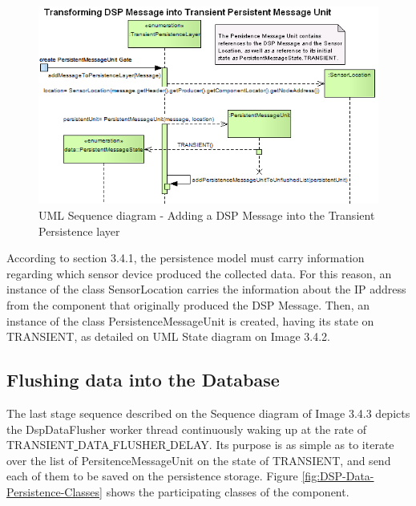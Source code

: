 \begin{figure}[!b]
  \centering
  \includegraphics[scale=0.5]{../diagrams/From-Create-PersistentMessageUnit-to-TransientPersistence-Layer-Sequence}
  \caption{UML Sequence diagram - Adding a DSP Message into the Transient Persistence layer}
  \label{fig:From-Create-PersistentMessageUnit-to-TransientPersistence-Layer-Sequence}
\end{figure}

According to section 3.4.1, the persistence model must carry information
regarding which sensor device produced the collected data. For this reason, an
instance of the class SensorLocation carries the information about the IP
address from the component that originally produced the DSP Message. Then, an
instance of the class PersistenceMessageUnit is created, having its state on
TRANSIENT, as detailed on UML State diagram on Image 3.4.2.

\subsection{Flushing data into the Database}

The last stage sequence described on the Sequence diagram of Image 3.4.3
depicts the DspDataFlusher worker thread continuously waking up at the rate of
TRANSIENT\underline{ }DATA\underline{ }FLUSHER\underline{ }DELAY. Its purpose is as simple as to iterate over the
list of PersitenceMessageUnit on the state of TRANSIENT, and send each of them
to be saved on the persistence storage. Figure
\ref{fig:DSP-Data-Persistence-Classes} shows the participating classes of the
component.


